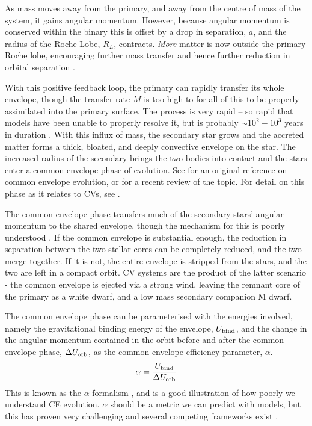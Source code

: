 As mass moves away from the primary, and away from the centre of mass of the system, it gains angular momentum. However, because angular momentum is conserved within the binary this is offset by a drop in separation, $a$, and the radius of the Roche Lobe, ${R_L}$, contracts. \textit{More} matter is now outside the primary Roche lobe, encouraging further mass transfer and hence further reduction in orbital separation \citep{Ritter2008}.

With this positive feedback loop, the primary can rapidly transfer its whole envelope, though the transfer rate $\dot M$ is too high to for all of this to be properly assimilated into the primary surface. The process is very rapid -- so rapid that models have been unable to properly resolve it, but is probably $\sim 10^2 - 10^3$ years in duration \citep{Ritter2012}. With this influx of mass, the secondary star grows and the accreted matter forms a thick, bloated, and deeply convective envelope on the star. The increased radius of the secondary brings the two bodies into contact \citep{Ritter2008} and the stars enter a common envelope phase of evolution. See \citet{paczynski1976} for an original reference on common envelope evolution, or \citet{ivanova2020} for a recent review of the topic. For detail on this phase as it relates to CVs, see \citet{taam1978, webbink1984, zorotovic2010, passy2011}.

The common envelope phase transfers much of the secondary stars' angular momentum to the shared envelope, though the mechanism for this is poorly understood \citep{demarco2011}. If the common envelope is substantial enough, the reduction in separation between the two stellar cores can be completely reduced, and the two merge together. If it is not, the entire envelope is stripped from the stars, and the two are left in a compact orbit. CV systems are the product of the latter scenario - the common envelope is ejected via a strong wind, leaving the remnant core of the primary as a white dwarf, and a low mass secondary companion M dwarf. 

The common envelope phase can be parameterised with the energies involved, namely the gravitational binding energy of the envelope, $U_{\rm bind}$, and the change in the angular momentum contained in the orbit before and after the common envelope phase, $\Delta U_{\rm orb}$, as the common envelope efficiency parameter, $\alpha$.
\begin{equation}
    \alpha = \frac{U_{\rm bind}}{\Delta U_{\rm orb}}
\end{equation}
This is known as the $\alpha$ formalism \citep{demarco2011}, and is a good illustration of how poorly we understand CE evolution. $\alpha$ should be a metric we can predict with models, but this has proven very challenging and several competing frameworks exist \citep{ivanova2020}. 

